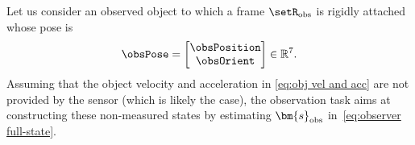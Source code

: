 Let us consider an observed object to which a frame $\setR_{\rm obs}$ is rigidly attached whose pose is 
\begin{equation}
	\obsPose = 
	\begin{bmatrix}
		\obsPosition \\ \obsOrient
	\end{bmatrix}\in \mathbb{R}^7.  
\end{equation}
	Assuming that the object velocity and acceleration in \cref{eq:obj vel and acc} are not provided by the sensor (which is likely the case), the observation task aims at constructing these non-measured states by estimating $\bm{s}_{\rm obs}$ in~\cref{eq:observer full-state}. 
